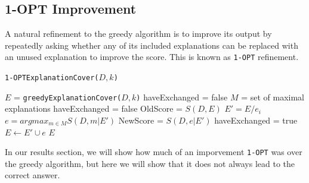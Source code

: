 \subsection{1-OPT Improvement}

A natural refinement to the greedy algorithm is to improve its output by repeatedly asking whether any of its included explanations can be replaced with an unused explanation to improve the score.  This is known as \texttt{1-OPT} refinement.  

\begin{algorithm}
  \caption{ \texttt{1-OPTExplanationCover($D,k$)} }
  \label{alg:1-OPT}
  \begin{algorithmic}
    \State $E$ =  \texttt{greedyExplanationCover($D,k$)}
    \State haveExchanged = false
    \State $M$ = set of maximal explanations
    \Repeat
    \State haveExchanged = false
    \State OldScore = $S(D,E)$
    \State $E' = E / e_i$
    \State $e = argmax_{m \in M} S(D,m|E')$
    \State NewScore = $S(D,e|E')$
    \State haveExchanged = true
    \State $E \leftarrow E' \cup e$
    \EndIf
    \EndFor
    \State \Return $E$
  \end{algorithmic}
\end{algorithm}

In our results section, we will show how much of an imporvement \texttt{1-OPT} was over the greedy algorithm, but here we will show that it does not always lead to the correct answer.

